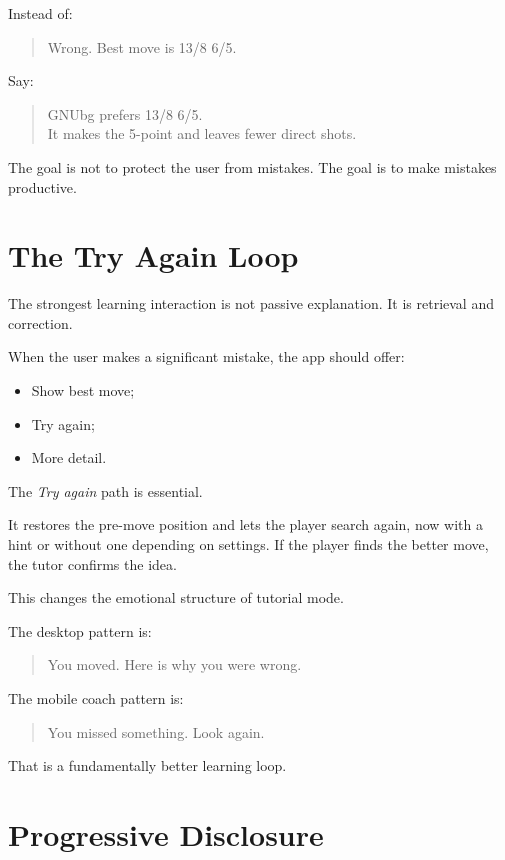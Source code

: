 \documentclass[11pt,a4paper]{article}
\begin{document}
Instead of:

\begin{quote}
Wrong. Best move is 13/8 6/5.
\end{quote}

Say:

\begin{quote}
GNUbg prefers 13/8 6/5.\\
It makes the 5-point and leaves fewer direct shots.
\end{quote}

The goal is not to protect the user from mistakes. The goal is to make mistakes productive.

\section{The Try Again Loop}

The strongest learning interaction is not passive explanation. It is retrieval and correction.

When the user makes a significant mistake, the app should offer:

\begin{itemize}
  \item Show best move;
  \item Try again;
  \item More detail.
\end{itemize}

The \textit{Try again} path is essential.

It restores the pre-move position and lets the player search again, now with a hint or without one depending on settings. If the player finds the better move, the tutor confirms the idea.

This changes the emotional structure of tutorial mode.

The desktop pattern is:

\begin{quote}
You moved. Here is why you were wrong.
\end{quote}

The mobile coach pattern is:

\begin{quote}
You missed something. Look again.
\end{quote}

That is a fundamentally better learning loop.

\section{Progressive Disclosure}
\end{document}
